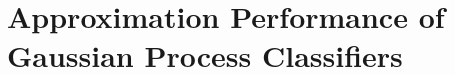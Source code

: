 \chapter{Approximation Performance of Gaussian Process Classifiers}
\label{Appendix:ApproximationPerformance}